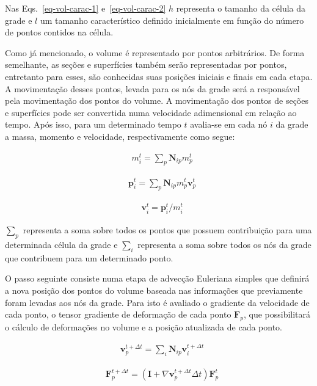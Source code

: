 Nas Eqs.~\ref{eq-vol-carac-1} e~\ref{eq-vol-carac-2} $h$ representa o tamanho da célula da grade e $l$ um tamanho característico definido inicialmente em função do número de pontos contidos na célula.

Como já mencionado, o volume é representado por pontos arbitrários. De forma semelhante, as seções e superfícies também serão representadas por pontos, entretanto para esses, são conhecidas suas posições iniciais e finais em cada etapa. A movimentação desses pontos, levada para os nós da grade será a responsável pela movimentação dos pontos do volume. A movimentação dos pontos de seções e superfícies pode ser convertida numa velocidade adimensional em relação ao tempo. Após isso, para um determinado tempo $t$ avalia-se em cada nó $i$ da grade a massa, momento e velocidade, respectivamente como segue:

\begin{align}
  &m_i^t = \textstyle\sum_p\boldsymbol{N}_{ip}m_p^t
\end{align}

\begin{align}
  &\boldsymbol{p}_i^t = \textstyle\sum_p\boldsymbol{N}_{ip}m_p^t\boldsymbol{v}_p^t
\end{align}

\begin{align}
  &\boldsymbol{v}_i^t = \boldsymbol{p}_i^t / m_i^t
\end{align}

$\sum_p$ representa a soma sobre todos os pontos que possuem contribuição para uma determinada célula da grade e $\sum_i$ representa a soma sobre todos os nós da grade que contribuem para um determinado ponto.

O passo seguinte consiste numa etapa de advecção Euleriana simples que definirá a nova posição dos pontos do volume baseada nas informações que previamente foram levadas aos nós da grade. Para isto é avaliado o gradiente da velocidade de cada ponto, o tensor gradiente de deformação de cada ponto $\boldsymbol{F}_p$, que possibilitará o cálculo de deformações no volume e a posição atualizada de cada ponto.

\begin{align}
  &\boldsymbol{v}_p^{t+\Delta t} = \textstyle\sum_i\boldsymbol{N}_{ip}\boldsymbol{v}_i^{t+\Delta t}
\end{align}

\begin{align}
  &\boldsymbol{F}_p^{t+\Delta t} = (\boldsymbol{I} + \nabla\boldsymbol{v}_p^{t+\Delta t}\Delta t) \boldsymbol{F}_p^t
\end{align}

